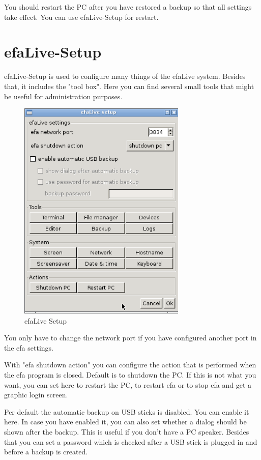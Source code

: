 \documentclass[a4paper,12pt,twoside]{article}
\begin{document}
You should restart the PC after you have restored a backup so that all
settings take effect. You can use efaLive-Setup for restart.


\section{efaLive-Setup}
\label{sct:efalivesetup}
efaLive-Setup is used to configure
many things of the efaLive system. Besides that, it includes the
"tool box". Here you can find several small
tools that might be useful for administration purposes.

\begin{figure}
    \centering
    \includegraphics[width=8cm]{efaLiveen-img/efaLive_efaLiveSetup_en.png}
    \caption{efaLive Setup}
    \label{fig:efalivesetup}
\end{figure}

You only have to change the network port
if you have configured another port in the efa settings.

With "efa shutdown action" you can configure
the action that is performed when the efa program is closed. Default is
to shutdown the PC. If this is not what you want, you can set here to
restart the PC, to restart efa or to stop efa and get a graphic login 
screen.

Per default the automatic backup on USB sticks is disabled. You can
enable it here. In case you have enabled it, you can also set whether a
dialog should be shown after the backup. This is useful if you
don't have a PC speaker. Besides that you can set a password which is
checked after a USB stick is plugged in and before a backup is created.
\end{document}
